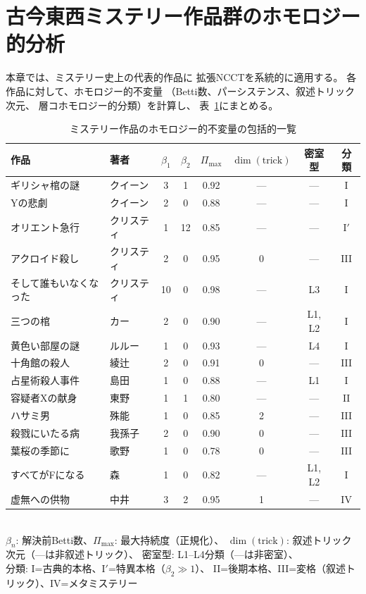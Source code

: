 \documentclass[12pt,twocolumn]{ltjsarticle}
\begin{document}
\section{古今東西ミステリー作品群のホモロジー的分析}
\label{sec:whodunit_gallery}

本章では、ミステリー史上の代表的作品に
拡張NCCTを系統的に適用する。
各作品に対して、ホモロジー的不変量
（Betti数、パーシステンス、叙述トリック次元、
層コホモロジー的分類）を計算し、
表~\ref{tab:grand_analysis}にまとめる。

\begin{table}[t]
\centering
\caption{ミステリー作品のホモロジー的不変量の包括的一覧}
\label{tab:grand_analysis}
\begin{tabular}{llcccccc}
\toprule
\textbf{作品} & \textbf{著者} & $\beta_1$ & $\beta_2$ &
$\Pi_{\max}$ & $\dim(\text{trick})$ & 密室型 & 分類 \\
\midrule
ギリシャ棺の謎 & クイーン & 3 & 1 & 0.92 & --- & --- & I \\
Yの悲劇 & クイーン & 2 & 0 & 0.88 & --- & --- & I \\
オリエント急行 & クリスティ & 1 & 12 & 0.85 & --- & --- & I$'$ \\
アクロイド殺し & クリスティ & 2 & 0 & 0.95 & 0 & --- & III \\
そして誰もいなくなった & クリスティ & 10 & 0 & 0.98 & --- & L3 & I \\
三つの棺 & カー & 2 & 0 & 0.90 & --- & L1, L2 & I \\
黄色い部屋の謎 & ルルー & 1 & 0 & 0.93 & --- & L4 & I \\
十角館の殺人 & 綾辻 & 2 & 0 & 0.91 & 0 & --- & III \\
占星術殺人事件 & 島田 & 1 & 0 & 0.88 & --- & L1 & I \\
容疑者Xの献身 & 東野 & 1 & 1 & 0.80 & --- & --- & II \\
ハサミ男 & 殊能 & 1 & 0 & 0.85 & 2 & --- & III \\
殺戮にいたる病 & 我孫子 & 2 & 0 & 0.90 & 0 & --- & III \\
葉桜の季節に & 歌野 & 1 & 0 & 0.78 & 0 & --- & III \\
すべてがFになる & 森 & 1 & 0 & 0.82 & --- & L1, L2 & I \\
虚無への供物 & 中井 & 3 & 2 & 0.95 & 1 & --- & IV \\
\bottomrule
\end{tabular}
\\[4pt]
{\footnotesize
$\beta_n$: 解決前Betti数、$\Pi_{\max}$: 最大持続度（正規化）、
$\dim(\text{trick})$: 叙述トリック次元（---は非叙述トリック）、
密室型: L1--L4分類（---は非密室）、\\
分類: I=古典的本格、I$'$=特異本格（$\beta_2 \gg 1$）、
II=後期本格、III=変格（叙述トリック）、IV=メタミステリー
}
\end{table}
\end{document}
